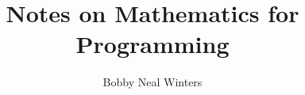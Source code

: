 \documentclass[12pt]{book}
\theoremstyle{plain}
\begin{document}
    \frontmatter
    \title{Notes on Mathematics for Programming}
    \author{Bobby Neal Winters}
    \date{}
    \maketitle
    \tableofcontents
    \mainmatter
    
    

    


    
\end{document}
